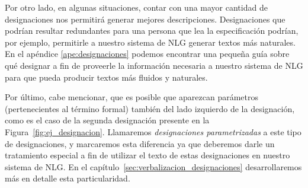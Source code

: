 Por otro lado, en algunas situaciones, contar con una mayor cantidad de designaciones nos permitirá generar mejores descripciones. Designaciones que podrían resultar redundantes para una persona que lea la especificación podrían, por ejemplo, permitirle a nuestro sistema de NLG generar textos más naturales. En el apéndice \ref{ape:designaciones} podemos encontrar una pequeña guía sobre qué designar a fin de proveerle la información necesaria a nuestro sistema de NLG para que pueda producir textos más fluidos y naturales.

Por último, cabe mencionar, que es posible que aparezcan parámetros (pertenecientes al término formal) también del lado izquierdo de la designación, como es el caso de la segunda designación presente en la Figura~\ref{fig:ej_designacion}. Llamaremos \emph{designaciones parametrizadas} a este tipo de designaciones, y marcaremos esta diferencia ya que deberemos darle un tratamiento especial a fin de utilizar el texto de estas designaciones en nuestro sistema de NLG. En el capítulo~\ref{sec:verbalizacion_designaciones} desarrollaremos más en detalle esta particularidad. 

